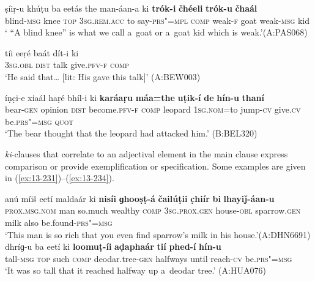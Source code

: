 \begin{exe}
\ex
\label{ex:13-228}
\gll ṣíiṛ-u khúṭu ba eetás the  man-áan-a ki \textbf{trók-i} \textbf{čhéeli} \textbf{trók-u} \textbf{čhaál} \\
blind-\textsc{msg} knee \textsc{top} \textsc{3sg.rem.acc} to say-\textsc{prs"=mpl} \textsc{comp} weak-\textsc{f} goat weak-\textsc{msg} kid \\
\glt ` ``A blind knee'' is what we call a~goat or a~goat kid which is weak.'\newline (A:PAS068)

\ex
\label{ex:13-229}
\gll tíi eeṛé baát dít-i ki  \\
\textsc{3sg.obl} \textsc{dist} talk give.\textsc{pfv-f} \textsc{comp}  \\
\glt `He said that{\ldots} [lit: His gave this talk]' (A:BEW003)

\ex
\label{ex:13-230}
\gll íṇc̣i-e xiaál haṛé bhíl-i  ki \textbf{karáaṛu} \textbf{máa=the} \textbf{uṭik-í} \textbf{de} \textbf{hín-u} \textbf{thaní} \\
bear-\textsc{gen} opinion \textsc{dist} become.\textsc{pfv-f} \textsc{comp} leopard \textsc{1sg.nom=}to jump-\textsc{cv} give.\textsc{cv} be.\textsc{prs"=msg} \textsc{quot} \\
\glt `The bear thought that the leopard had attacked him.' (B:BEL320) 
\end{exe}

 \textit{ki}-clauses that correlate to an adjectival element in the main clause express comparison or provide exemplification or specification. Some examples are given in (\ref{ex:13-231})--(\ref{ex:13-234}).

\ea
\label{ex:13-231}
\gll anú míiš eetí maldaár ki \textbf{nisíi} \textbf{ɡhooṣṭ-á} \textbf{čailúṭii} \textbf{c̣hiír} \textbf{bi} \textbf{lhayiǰ-áan-u}\\
\textsc{prox.msg.nom} man so.much wealthy \textsc{comp} \textsc{3sg.prox.gen }  house-\textsc{obl} sparrow.\textsc{gen} milk also be.found-\textsc{prs"=msg}\\
\glt `This man is so rich that you even find sparrow's milk in his house.'\newline (A:DHN6691)
\ex
\label{ex:13-232}
\gll dhríɡ-u ba eetí ki \textbf{loomuṭ-íi} \textbf{aḍaphaár} \textbf{tií} \textbf{phed-í} \textbf{hín-u}\\
tall-\textsc{msg} \textsc{top} such \textsc{comp} deodar.tree-\textsc{gen} halfways until reach-\textsc{cv} be.\textsc{prs"=msg}\\
\glt `It was so tall that it reached halfway up a~deodar tree.' (A:HUA076)

